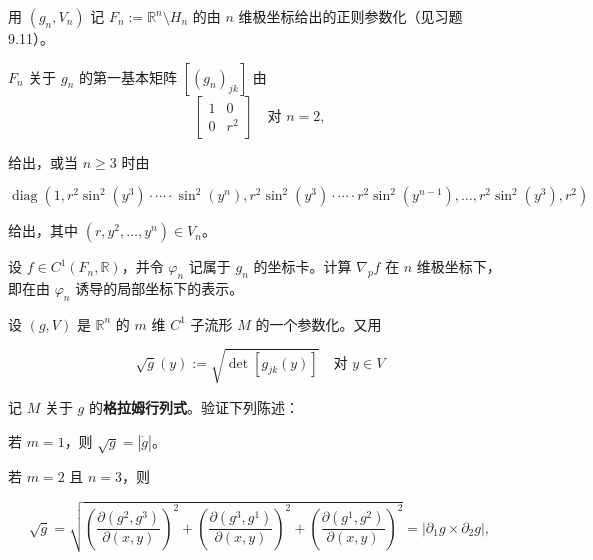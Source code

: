 \exerciseshead

\begin{exercises}
\item

用 $ (g_{n},V_{n}) $ 记 $ F_{n} := \mathbb{R}^{n}\setminus H_{n} $ 的由 $ n $ 维极坐标给出的正则参数化（见习题 9.11）。

\begin{items}
\item

\proofhead
$ F_{n} $ 关于 $ g_{n} $ 的第一基本矩阵 $ [(g_{n})_{jk}] $ 由
\begin{equation*}
\begin{bmatrix} 1 & 0 \\ 0 & r^{2} \end{bmatrix} \quad \text{对 } n = 2 ,
\end{equation*}

给出，或当 $ n \ge 3 $ 时由

\[
\operatorname{diag}\left( 1, r^{2}\sin^{2}(y^{3}) \cdot \cdots \cdot \sin^{2}(y^{n}), r^{2}\sin^{2}(y^{3}) \cdot \cdots \cdot r^{2}\sin^{2}(y^{n-1}), \ldots, r^{2}\sin^{2}(y^{3}), r^{2} \right)
\]

给出，其中 $ (r,y^{2},\ldots,y^{n}) \in V_{n} $。

\item

设 $ f \in C^{1}(F_{n},\mathbb{R}) $，并令 $ \varphi_{n} $ 记属于 $ g_{n} $ 的坐标卡。计算 $ \nabla_{p}f $ 在 $ n $ 维极坐标下，即在由 $ \varphi_{n} $ 诱导的局部坐标下的表示。

\end{items}

\item

设 $ (g,V) $ 是 $ \mathbb{R}^{n} $ 的 $ m $ 维 $ C^{1} $ 子流形 $ M $ 的一个参数化。又用

\[
\sqrt{g}(y) := \sqrt{\det\left[ g_{jk}(y) \right]} \quad \text{对 } y \in V
\]

记 $ M $ 关于 $ g $ 的\textbf{格拉姆行列式}。验证下列陈述：

\begin{items}
\item

若 $ m = 1 $，则 $ \sqrt{g} = |\dot{g}| $。

\item

若 $ m = 2 $ 且 $ n = 3 $，则

\[
\sqrt{g} = \sqrt{\left( \frac{\partial(g^{2},g^{3})}{\partial(x,y)} \right)^{2} + \left( \frac{\partial(g^{3},g^{1})}{\partial(x,y)} \right)^{2} + \left( \frac{\partial(g^{1},g^{2})}{\partial(x,y)} \right)^{2}} = |\partial_{1}g \times \partial_{2}g| ,
\]


\end{items}
\end{exercises}
